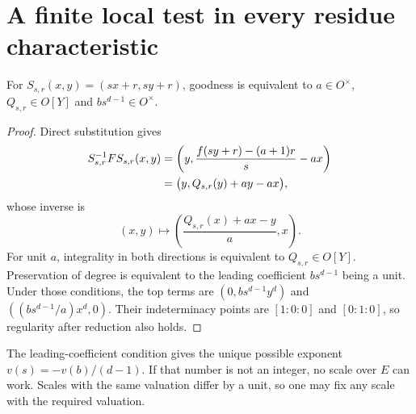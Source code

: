 \section{A finite local test in every residue characteristic}\label{sec:localtest}

\begin{lemma}\label{lem:scalar}
For $S_{s,r}(x,y)=(sx+r,sy+r)$, goodness is equivalent to
$a\in O^\times$, $Q_{s,r}\in O[Y]$ and $bs^{d-1}\in O^\times$.
\end{lemma}
\begin{proof}
Direct substitution gives
\begin{align}
 S_{s,r}^{-1}FS_{s,r}(x,y)
 &=\left(y,\frac{f(sy+r)-(a+1)r}{s}-ax\right)\notag\\
 &=\bigl(y,Q_{s,r}(y)+ay-ax\bigr),\label{eq:scalarmodel}
\end{align}
whose inverse is
\begin{equation}\label{eq:scalarinverse}
 (x,y)\longmapsto
 \left(\frac{Q_{s,r}(x)+ax-y}{a},x\right).
\end{equation}
For unit $a$, integrality in both directions is equivalent to
$Q_{s,r}\in O[Y]$. Preservation of degree is equivalent to the
leading coefficient $bs^{d-1}$ being a unit. Under those conditions,
the top terms are $(0,bs^{d-1}y^d)$ and
$((bs^{d-1}/a)x^d,0)$. Their indeterminacy points are $[1:0:0]$ and
$[0:1:0]$, so regularity after reduction also holds.
\end{proof}

The leading-coefficient condition gives the unique possible exponent
$v(s)=-v(b)/(d-1)$. If that number is not an integer, no scale over
$E$ can work. Scales with the same valuation differ by a unit, so
one may fix any scale with the required valuation.

